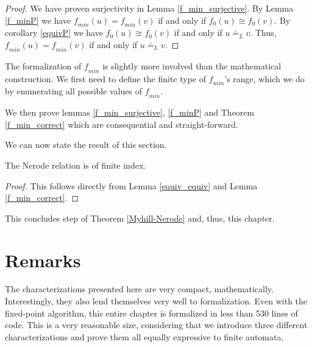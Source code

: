 \begin{proof}
    We have proven surjectivity in Lemma \ref{f_min_surjective}. 
    By Lemma \ref{f_minP} we have $\mathit{f_{min}}(u) = \mathit{f_{min}}(v)$ if and only if ${f_0}(u) \cong {f_0}(v)$.
    By corollary \ref{equivP} we have ${f_0}(u) \cong {f_0}(v)$ if and only if $u \doteq_L v$.
    Thus, $\mathit{f_{min}}(u) = \mathit{f_{min}}(v)$ if and only if $u \doteq_L v$.
\end{proof}


The formalization of $\mathit{f_{min}}$ is slightly more involved than the mathematical construction. 
We first need to define the finite type of $\mathit{f_{min}}$'s range, 
which we do by enumerating all possible values of $\mathit{f_{min}}$.



We then prove lemmas \ref{f_min_surjective}, \ref{f_minP} and Theorem \ref{f_min_correct} which are consequential and straight-forward.



We can now state the result of this section.

\begin{theorem}
    \label{weak_nerode_to_nerode}
    The Nerode relation is of finite index.
\end{theorem}
\begin{proof}
    This follows directly from Lemma \ref{equiv_equiv} and Lemma \ref{f_min_correct}.
\end{proof}



This concludes step  of Theorem \ref{Myhill-Nerode} and, thus, this chapter. 

\section*{Remarks}
The characterizations presented here are very compact, mathematically.
Interestingly, they also lend themselves very well to formalization.
Even with the fixed-point algorithm, this entire chapter is formalized in less than 530 lines of code.
This is a very reasonable size, considering that we introduce three different characterizations 
and prove them all equally expressive to finite automata.



